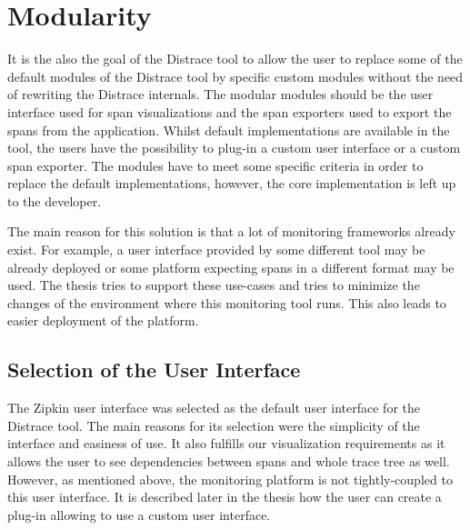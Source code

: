 \section{Modularity}
It is the also the goal of the Distrace tool to allow the user to replace some of the default modules of the Distrace tool by specific custom modules without the need of rewriting the Distrace internals. The modular modules should be the user interface used for span visualizations and the span exporters used to export the spans from the application. Whilst default implementations are available in the tool, the users have the possibility to plug-in a custom user interface or a custom span exporter. The modules have to meet some specific criteria in order to replace the default implementations, however, the core implementation is left up to the developer. 

The main reason for this solution is that a lot of monitoring frameworks already exist. For example, a user interface provided by some different tool may be already deployed or some platform  expecting spans in a different format may be used. The thesis tries to support these use-cases and tries to minimize the changes of the environment where this monitoring tool runs. This also leads to easier deployment of the platform. 

\subsection{Selection of the User Interface}
The Zipkin user interface was selected as the default user interface for the Distrace tool. The main reasons for its selection were the simplicity of the interface and easiness of use. It also fulfills our visualization requirements as it allows the user to see dependencies between spans and whole trace tree as well. However, as mentioned above, the monitoring platform is not tightly-coupled to this user interface. It is described later in the thesis how the user can create a plug-in allowing to use a custom user interface.

